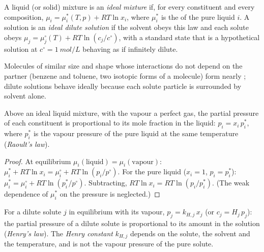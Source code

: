 \begin{definition}\label{def:b2:chemical-potential:ideal-mixture}
A liquid (or solid) mixture is an \emph{ideal mixture}
if, for every constituent and every composition,
$\mu_i = \mu_i^*(T, p) + RT\ln x_i$, where $\mu_i^*$ is the 
of the pure liquid $i$. A solution is an \emph{ideal dilute
solution} if the solvent obeys this law and each
solute obeys $\mu_j = \mu_j^\circ(T) + RT\ln(c_j/c^\circ)$, with a standard
state that is a hypothetical solution at $c^\circ = \qty{1}{mol/L}$ behaving
as if infinitely dilute.
\end{definition}

Molecules of similar size and shape whose interactions do not depend on
the partner (benzene and toluene, two isotopic forms of a molecule) form
nearly ; dilute solutions behave ideally because each solute
particle is surrounded by solvent alone.

\begin{theorem}\label{thm:b2:chemical-potential:raoult}
Above an ideal liquid mixture, with the vapour a perfect gas, the partial
pressure of each constituent is proportional to its mole fraction in the
liquid: $p_i = x_i\,p_i^*$, where $p_i^*$ is the vapour pressure of the pure
liquid at the same temperature (\emph{Raoult's law}).
\end{theorem}

\begin{proof}
At equilibrium $\mu_i(\text{liquid}) = \mu_i(\text{vapour})$: $\mu_i^* +
RT\ln x_i = \mu_i^\circ + RT\ln(p_i/p^\circ)$. For the pure liquid ($x_i = 1$,
$p_i = p_i^*$): $\mu_i^* = \mu_i^\circ + RT\ln(p_i^*/p^\circ)$. Subtracting,
$RT\ln x_i = RT\ln(p_i/p_i^*)$. (The weak dependence of $\mu_i^*$ on the
pressure is neglected.)
\end{proof}

\begin{proposition}\label{prop:b2:chemical-potential:henry}
For a dilute solute $j$ in equilibrium with its vapour, $p_j = k_{H,j}\,x_j$
(or $c_j = H_j\,p_j$): the partial pressure of a dilute solute is
proportional to its amount in the solution (\emph{Henry's
law}). The \emph{Henry constant}
$k_{H,j}$ depends on the solute, the solvent and the temperature, and is not
the vapour pressure of the pure solute.
\end{proposition}

